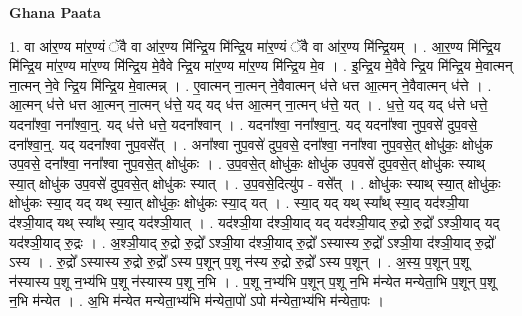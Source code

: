 \documentclass[17pt]{extarticle}
\begin{document}
\textbf{Ghana Paata } \newline

1. वा आ॑र॒ण्य मा॑र॒ण्यं ॅवै वा आ॑र॒ण्य मि॑न्द्रि॒य मि॑न्द्रि॒य मा॑र॒ण्यं ॅवै वा आ॑र॒ण्य मि॑न्द्रि॒यम् । . आ॒र॒ण्य मि॑न्द्रि॒य मि॑न्द्रि॒य मा॑र॒ण्य मा॑र॒ण्य मि॑न्द्रि॒य मे॒वैवे न्द्रि॒य मा॑र॒ण्य मा॑र॒ण्य मि॑न्द्रि॒य मे॒व । . इ॒न्द्रि॒य मे॒वैवे न्द्रि॒य मि॑न्द्रि॒य मे॒वात्मन् ना॒त्मन् ने॒वे न्द्रि॒य मि॑न्द्रि॒य मे॒वात्मन्न् । . ए॒वात्मन् ना॒त्मन् ने॒वैवात्मन् ध॑त्ते धत्त आ॒त्मन् ने॒वैवात्मन् ध॑त्ते । . आ॒त्मन् ध॑त्ते धत्त आ॒त्मन् ना॒त्मन् ध॑त्ते॒ यद् यद् ध॑त्त आ॒त्मन् ना॒त्मन् ध॑त्ते॒ यत् । . ध॒त्ते॒ यद् यद् ध॑त्ते धत्ते॒ यदना᳚श्वा॒ नना᳚श्वा॒न्॒. यद् ध॑त्ते धत्ते॒ यदना᳚श्वान् । . यदना᳚श्वा॒ नना᳚श्वा॒न्॒. यद् यदना᳚श्वा नुप॒वसे॑ दुप॒वसे॒ दना᳚श्वा॒न्॒. यद् यदना᳚श्वा नुप॒वसे᳚त् । . अना᳚श्वा नुप॒वसे॑ दुप॒वसे॒ दना᳚श्वा॒ नना᳚श्वा नुप॒वसे॒त् क्षोधु॑कः॒ क्षोधु॑क उप॒वसे॒ दना᳚श्वा॒ नना᳚श्वा नुप॒वसे॒त् क्षोधु॑कः । . उ॒प॒वसे॒त् क्षोधु॑कः॒ क्षोधु॑क उप॒वसे॑ दुप॒वसे॒त् क्षोधु॑कः स्याथ् स्या॒त् क्षोधु॑क उप॒वसे॑ दुप॒वसे॒त् क्षोधु॑कः स्यात् । . उ॒प॒वसे॒दित्यु॑प - वसे᳚त् । . क्षोधु॑कः स्याथ् स्या॒त् क्षोधु॑कः॒ क्षोधु॑कः स्या॒द् यद् यथ् स्या॒त् क्षोधु॑कः॒ क्षोधु॑कः स्या॒द् यत् । . स्या॒द् यद् यथ् स्या᳚थ् स्या॒द् यद॑श्ञी॒या द॑श्ञी॒याद् यथ् स्या᳚थ् स्या॒द् यद॑श्ञी॒यात् । . यद॑श्ञी॒या द॑श्ञी॒याद् यद् यद॑श्ञी॒याद् रु॒द्रो रु॒द्रो᳚ ऽश्ञी॒याद् यद् यद॑श्ञी॒याद् रु॒द्रः । . अ॒श्ञी॒याद् रु॒द्रो रु॒द्रो᳚ ऽश्ञी॒या द॑श्ञी॒याद् रु॒द्रो᳚ ऽस्यास्य रु॒द्रो᳚ ऽश्ञी॒या द॑श्ञी॒याद् रु॒द्रो᳚ ऽस्य । . रु॒द्रो᳚ ऽस्यास्य रु॒द्रो रु॒द्रो᳚ ऽस्य प॒शून् प॒शू न॑स्य रु॒द्रो रु॒द्रो᳚ ऽस्य प॒शून् । . अ॒स्य॒ प॒शून् प॒शू न॑स्यास्य प॒शू न॒भ्य॑भि प॒शू न॑स्यास्य प॒शू न॒भि । . प॒शू न॒भ्य॑भि प॒शून् प॒शू न॒भि म॑न्येत मन्येता॒भि प॒शून् प॒शू न॒भि म॑न्येत । . अ॒भि म॑न्येत मन्येता॒भ्य॑भि म॑न्येता॒पो॑ ऽपो म॑न्येता॒भ्य॑भि म॑न्येता॒पः । \newline
\end{document}
